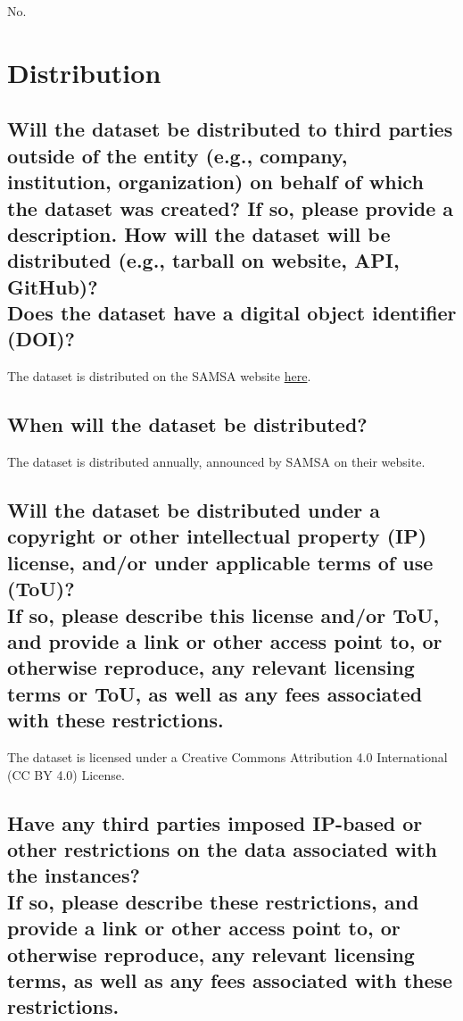 \documentclass[letterpaper, 10 pt, conference]{ieeeconf}  %
\newcommand{\subtitle}[1]{{\\ \small \normalfont \color{purple} #1}}
\begin{document}
No.

\section{Distribution}

\subsection{Will the dataset be distributed to third parties outside of the entity (e.g., company, institution, organization) on behalf of which the dataset was created? If so, please provide a description. How will the dataset will be distributed (e.g., tarball on website, API, GitHub)? \subtitle{Does the dataset have a digital object identifier (DOI)?}}
The dataset is distributed on the SAMSA website \href{https://www.datafiles.samhsa.gov/dataset/national-survey-drug-use-and-health-2019-nsduh-2019-ds0001}{here}.

\subsection{When will the dataset be distributed?}

The dataset is distributed annually, announced by SAMSA on their website.

\subsection{Will the dataset be distributed under a copyright or other intellectual property (IP) license, and/or under applicable terms of use (ToU)? \subtitle{If so, please describe this license and/or ToU, and provide a link or other access point to, or otherwise reproduce, any relevant licensing terms or ToU, as well as any fees associated with these restrictions.}}

The dataset is licensed under a Creative Commons Attribution 4.0 International (CC BY 4.0) License.

\subsection{Have any third parties imposed IP-based or other restrictions on the data associated with the instances? \subtitle{If so, please describe these restrictions, and provide a link or other access point to, or otherwise reproduce, any relevant licensing terms, as well as any fees associated with these restrictions.}}
\end{document}

